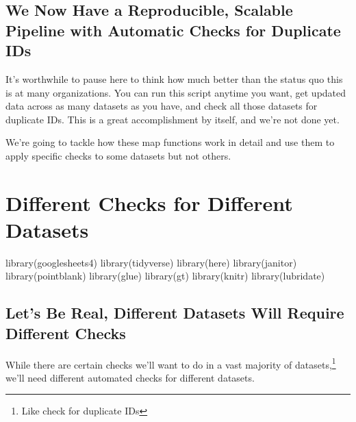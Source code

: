 \documentclass[
  letterpaper,
  DIV=11,
  numbers=noendperiod]{scrreprt}
\newenvironment{Shaded}{\begin{snugshade}}{\end{snugshade}}
\newcommand{\FunctionTok}[1]{\textcolor[rgb]{0.28,0.35,0.67}{#1}}
\newcommand{\NormalTok}[1]{\textcolor[rgb]{0.00,0.23,0.31}{#1}}
\begin{document}
\hypertarget{we-now-have-a-reproducible-scalable-pipeline-with-automatic-checks-for-duplicate-ids}{%
\section{We Now Have a Reproducible, Scalable Pipeline with Automatic
Checks for Duplicate
IDs}\label{we-now-have-a-reproducible-scalable-pipeline-with-automatic-checks-for-duplicate-ids}}

It's worthwhile to pause here to think how much better than the status
quo this is at many organizations. You can run this script anytime you
want, get updated data across as many datasets as you have, and check
all those datasets for duplicate IDs. This is a great accomplishment by
itself, and we're not done yet.

We're going to tackle how these map functions work in detail and use
them to apply specific checks to some datasets but not others.


\hypertarget{different-checks-for-different-datasets}{%
\chapter{Different Checks for Different
Datasets}\label{different-checks-for-different-datasets}}

\begin{Shaded}
\begin{Highlighting}[]
\FunctionTok{library}\NormalTok{(googlesheets4)}
\FunctionTok{library}\NormalTok{(tidyverse)}
\FunctionTok{library}\NormalTok{(here)}
\FunctionTok{library}\NormalTok{(janitor)}
\FunctionTok{library}\NormalTok{(pointblank)}
\FunctionTok{library}\NormalTok{(glue)}
\FunctionTok{library}\NormalTok{(gt)}
\FunctionTok{library}\NormalTok{(knitr)}
\FunctionTok{library}\NormalTok{(lubridate)}
\end{Highlighting}
\end{Shaded}

\hypertarget{lets-be-real-different-datasets-will-require-different-checks}{%
\section{Let's Be Real, Different Datasets Will Require Different
Checks}\label{lets-be-real-different-datasets-will-require-different-checks}}

While there are certain checks we'll want to do in a vast majority of
datasets,\footnote{Like check for duplicate IDs} we'll need different
automated checks for different datasets.
\end{document}
